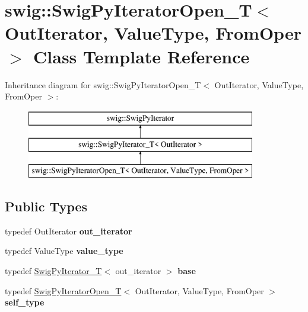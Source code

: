 \hypertarget{classswig_1_1SwigPyIteratorOpen__T}{}\section{swig\+:\+:Swig\+Py\+Iterator\+Open\+\_\+T$<$ Out\+Iterator, Value\+Type, From\+Oper $>$ Class Template Reference}
\label{classswig_1_1SwigPyIteratorOpen__T}
Inheritance diagram for swig\+:\+:Swig\+Py\+Iterator\+Open\+\_\+T$<$ Out\+Iterator, Value\+Type, From\+Oper $>$\+:\begin{figure}[H]
\begin{center}
\leavevmode
\includegraphics[height=3.000000cm]{classswig_1_1SwigPyIteratorOpen__T}
\end{center}
\end{figure}
\subsection*{Public Types}
\begin{DoxyCompactItemize}
\item 
\mbox{\label{classswig_1_1SwigPyIteratorOpen__T_ad348022c40678f2217e0696c8b6bb59b}} 
typedef Out\+Iterator {\bfseries out\+\_\+iterator}
\item 
\mbox{\label{classswig_1_1SwigPyIteratorOpen__T_ac5d08f0ecc1d014a83632411678103f3}} 
typedef Value\+Type {\bfseries value\+\_\+type}
\item 
\mbox{\label{classswig_1_1SwigPyIteratorOpen__T_acee28cc32d3d9a19f711bd9df933b06c}} 
typedef \mbox{\hyperlink{classswig_1_1SwigPyIterator__T}{Swig\+Py\+Iterator\+\_\+T}}$<$ out\+\_\+iterator $>$ {\bfseries base}
\item 
\mbox{\label{classswig_1_1SwigPyIteratorOpen__T_a232561380f04d1a22f772e24d6ff38e5}} 
typedef \mbox{\hyperlink{classswig_1_1SwigPyIteratorOpen__T}{Swig\+Py\+Iterator\+Open\+\_\+T}}$<$ Out\+Iterator, Value\+Type, From\+Oper $>$ {\bfseries self\+\_\+type}
\end{DoxyCompactItemize}
